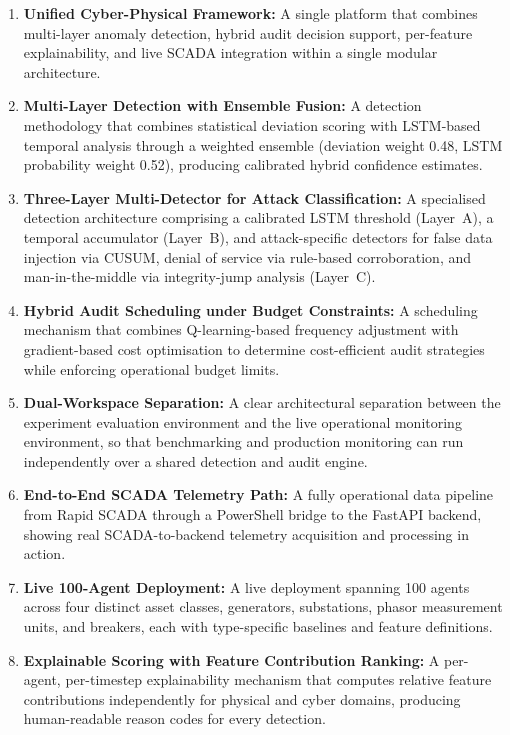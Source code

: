 \begin{enumerate}
    \item \textbf{Unified Cyber-Physical Framework:} A single platform that combines multi-layer anomaly detection, hybrid audit decision support, per-feature explainability, and live SCADA integration within a single modular architecture.

    \item \textbf{Multi-Layer Detection with Ensemble Fusion:} A detection methodology that combines statistical deviation scoring with LSTM-based temporal analysis through a weighted ensemble (deviation weight 0.48, LSTM probability weight 0.52), producing calibrated hybrid confidence estimates.

    \item \textbf{Three-Layer Multi-Detector for Attack Classification:} A specialised detection architecture comprising a calibrated LSTM threshold (Layer~A), a temporal accumulator (Layer~B), and attack-specific detectors for false data injection via CUSUM, denial of service via rule-based corroboration, and man-in-the-middle via integrity-jump analysis (Layer~C).

    \item \textbf{Hybrid Audit Scheduling under Budget Constraints:} A scheduling mechanism that combines Q-learning-based frequency adjustment with gradient-based cost optimisation to determine cost-efficient audit strategies while enforcing operational budget limits.

    \item \textbf{Dual-Workspace Separation:} A clear architectural separation between the experiment evaluation environment and the live operational monitoring environment, so that benchmarking and production monitoring can run independently over a shared detection and audit engine.

    \item \textbf{End-to-End SCADA Telemetry Path:} A fully operational data pipeline from Rapid SCADA through a PowerShell bridge to the FastAPI backend, showing real SCADA-to-backend telemetry acquisition and processing in action.

    \item \textbf{Live 100-Agent Deployment:} A live deployment spanning 100 agents across four distinct asset classes, generators, substations, phasor measurement units, and breakers, each with type-specific baselines and feature definitions.

    \item \textbf{Explainable Scoring with Feature Contribution Ranking:} A per-agent, per-timestep explainability mechanism that computes relative feature contributions independently for physical and cyber domains, producing human-readable reason codes for every detection.


\end{enumerate}
